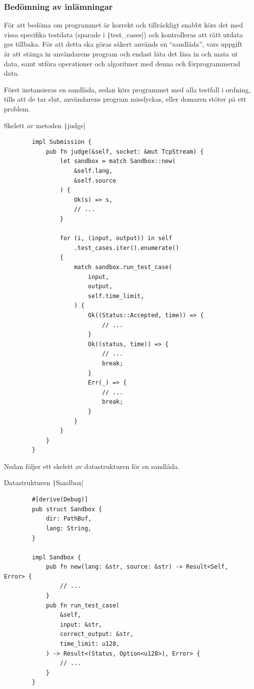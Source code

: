 \documentclass{article}
\begin{document}
\subsubsection{Bedömning av inlämningar}

För att bedöma om programmet är korrekt och tillräckligt snabbt körs det med
vissa specifika testdata (sparade i \texttt|test_cases|) och kontrolleras
att rätt utdata ges tillbaka. För att detta ska göras säkert används en
``sandlåda'', vars uppgift är att stänga in användarens program och endast låta
det läsa in och mata ut data, samt utföra operationer och algoritmer med denna
och förprogrammerad data.

Först instansieras en sandlåda, sedan körs programmet med alla testfall i
ordning, tills att de tar slut, användarens program misslyckas, eller domaren
stöter på ett problem.

\begin{listing}[H]
	\caption{Skelett av metoden
		\texttt|judge|\label{judge-method}}
	\begin{verbatim}
		impl Submission {
			pub fn judge(&self, socket: &mut TcpStream) {
				let sandbox = match Sandbox::new(
					&self.lang,
					&self.source
				) {
					Ok(s) => s,
					// ...
				}

				for (i, (input, output)) in self
					.test_cases.iter().enumerate()
				{
					match sandbox.run_test_case(
						input,
						output,
						self.time_limit,
					) {
						Ok((Status::Accepted, time)) => {
							// ...
						}
						Ok((status, time)) => {
							// ...
							break;
						}
						Err(_) => {
							// ...
							break;
						}
					}
				}
			}
		}
	\end{verbatim}
\end{listing}

Nedan följer ett skelett av datastrukturen för en sandlåda.

\begin{listing}[H]
	\caption{Datastrukturen \texttt|Sandbox|}
	\begin{verbatim}
		#[derive(Debug)]
		pub struct Sandbox {
			dir: PathBuf,
			lang: String,
		}

		impl Sandbox {
			pub fn new(lang: &str, source: &str) -> Result<Self, Error> {
				// ...
			}
			pub fn run_test_case(
				&self,
				input: &str,
				correct_output: &str,
				time_limit: u128,
			) -> Result<(Status, Option<u128>), Error> {
				// ...
			}
		}
	\end{verbatim}
\end{listing}
\end{document}
